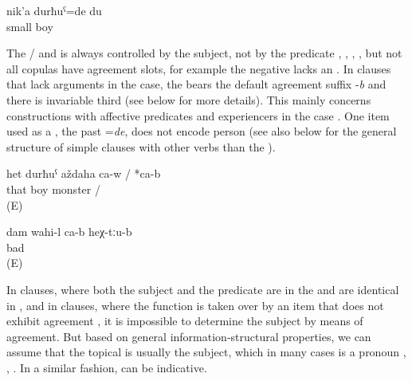 \begin{exe}
	\ex	\label{ex:‎I was a little boy@A}
	\gll	nik'a	durħuˁ=de	du\\
		small	boy	\\
	\glt	{}
\end{exe}

The / and  is always controlled by the  subject, not by the predicate , ,  ,  , but not all copulas have  agreement slots, for example the negative  lacks an . In  clauses that lack arguments in the  case, the  bears the default agreement suffix -\textit{b} and there is invariable third  (see  below for more details). This mainly concerns  constructions with affective predicates and experiencers in the  case . One item used as a , the past  =\textit{de}, does not encode person  (see also  below for the general structure of simple clauses with other verbs than the ).

\begin{exe}
	\ex	\label{ex:‎‎‎That boy is a monster}
	\gll	het	durħuˁ	aždaha	ca-w	/ *ca-b\\
		that	boy	monster		/ \\
	\glt	{} (E)
	
	\ex	\label{ex:I feel(s) bad there}
	\gll	dam	wahi-l	ca-b	heχ-tːu-b\\
			bad		\\
	\glt	{} (E)	
	
\end{exe}


In  clauses, where both the subject and the predicate are in the  and are identical in  , and in  clauses, where the  function is taken over by an item that does not exhibit agreement , it is impossible to determine the  subject by means of agreement. But based on general information-structural properties, we can assume that the topical  is usually the subject, which in many cases is a pronoun , , . In a similar fashion,  can be indicative. 

